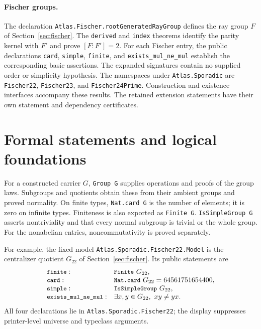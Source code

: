 \documentclass[11pt]{article}
\numberwithin{equation}{section}
\theoremstyle{definition}
\newcommand{\code}[1]{\texttt{\small #1}}
\newcommand{\leanname}[1]{{\small\nolinkurl{#1}}}
\begin{document}
\paragraph{Fischer groups.}
The declaration \leanname{Atlas.Fischer.rootGeneratedRayGroup}
defines the ray group $F$ of Section~\ref{sec:fischer}. The
\code{derived} and \code{index} theorems identify the parity kernel
with $F'$ and prove $[F:F']=2$.
For each Fischer entry, the public declarations \code{card}, \code{simple}, \code{finite}, and
\code{exists\_mul\_ne\_mul} establish the corresponding basic assertions.
The expanded signatures contain no supplied order or simplicity
hypothesis. The namespaces under \code{Atlas.Sporadic} are
\code{Fischer22}, \code{Fischer23}, and \code{Fischer24Prime}.
Construction and existence interfaces accompany these results.
The retained extension statements have their own statement and
dependency certificates.

\FloatBarrier

\section{Formal statements and logical foundations}\label{sec:foundations}

For a constructed carrier $G$, \code{Group G} supplies operations and
proofs of the group laws. Subgroups and quotients obtain these from
their ambient groups and proved normality. On finite types,
\code{Nat.card G} is the number of elements; it is zero on infinite
types. Finiteness is also exported as \code{Finite G}.
\code{IsSimpleGroup G} asserts nontriviality and that every normal
subgroup is trivial or the whole group. For the nonabelian entries,
noncommutativity is proved separately.

For example, the fixed model \leanname{Atlas.Sporadic.Fischer22.Model}
is the centralizer quotient $G_{22}$ of Section~\ref{sec:fischer}.
Its public statements are
\[
\begin{array}{ll}
 \code{finite}: & \code{Finite}\ G_{22},\\
 \code{card}: & \code{Nat.card}\ G_{22}=64561751654400,\\
 \code{simple}: & \code{IsSimpleGroup}\ G_{22},\\
 \code{exists\_mul\_ne\_mul}: & \exists x,y\in G_{22},\ xy\ne yx.
\end{array}
\]
All four declarations lie in \code{Atlas.Sporadic.Fischer22}; the
display suppresses printer-level universe and typeclass arguments.
\end{document}

